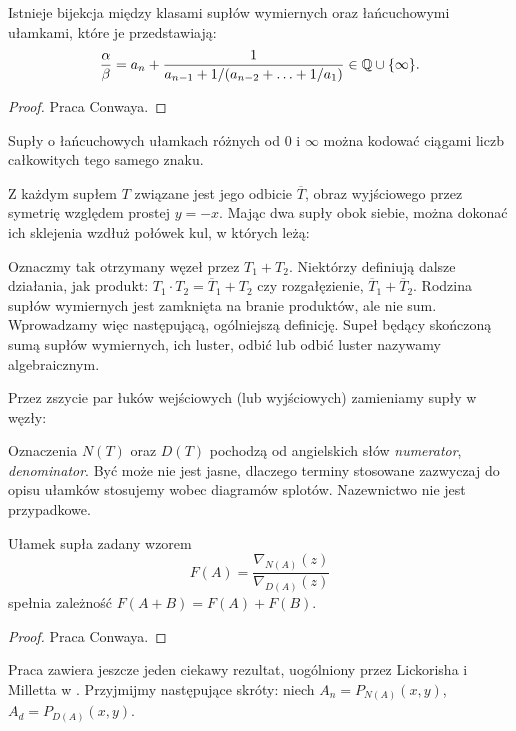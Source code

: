\begin{proposition}
\label{prp:continued_fractions}
	Istnieje bijekcja między klasami supłów wymiernych oraz łańcuchowymi ułamkami, które je przedstawiają:
	\[
		\frac \alpha \beta = a_n + \frac{1}{a_{n-1} + 1 / (a_{n-2} +  \ldots + 1/a_1)} \in \mathbb Q \cup \{\infty\}.
	\]
\end{proposition}

\begin{proof}
	Praca \cite{conway70} Conwaya.
\end{proof}

\begin{proposition}
\label{prp:continued_fractions_2}
	Supły o łańcuchowych ułamkach różnych od $0$ i $\infty$ można kodować ciągami liczb całkowitych tego samego znaku.
\end{proposition}

Z każdym supłem $T$ związane jest jego odbicie $\overline T$, obraz wyjściowego przez symetrię względem prostej $y = -x$.
Mając dwa supły obok siebie, można dokonać ich sklejenia wzdłuż połówek kul, w których leżą:


Oznaczmy tak otrzymany węzeł przez $T_1 + T_2$.
Niektórzy definiują dalsze działania, jak produkt: $T_1 \cdot T_2 = \overline T_1 + T_2$ czy rozgałęzienie, $\overline T_1 + \overline T_2$.
Rodzina supłów wymiernych jest zamknięta na branie produktów, ale nie sum.
Wprowadzamy więc następującą, ogólniejszą definicję.
Supeł będący skończoną sumą supłów wymiernych, ich luster, odbić lub odbić luster nazywamy algebraicznym.

Przez zszycie par łuków wejściowych (lub wyjściowych) zamieniamy supły w węzły:


Oznaczenia $N(T)$ oraz $D(T)$ pochodzą od angielskich słów \emph{numerator}, \emph{denominator}.
Być może nie jest jasne, dlaczego terminy stosowane zazwyczaj do opisu ułamków stosujemy wobec diagramów splotów.
Nazewnictwo nie jest przypadkowe. %
\begin{proposition}
\label{prp:knot_fraction}
	Ułamek supła zadany wzorem
	\[
		F(A) = \frac{\nabla_{N(A)}(z)}{\nabla_{D(A)}(z)}
	\]
	spełnia zależność $F(A+B) = F(A) + F(B)$.
\end{proposition}

\begin{proof}
	Praca \cite{conway70} Conwaya.
\end{proof}

Praca \cite{conway70} zawiera jeszcze jeden ciekawy rezultat, uogólniony przez Lickorisha i Milletta w \cite{lickorish87}.
Przyjmijmy następujące skróty: niech $A_n = P_{N(A)}(x,y)$, $A_d = P_{D(A)}(x,y)$.

